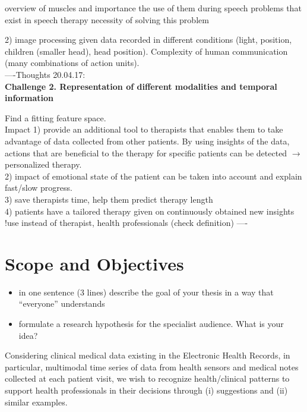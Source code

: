 overview of muscles and importance
the use of them during speech
problems that exist in speech therapy
necessity of solving this problem

2) image processing given data recorded in different conditions (light, position, children (smaller head), head position). Complexity of human communication (many combinations of action units).\\


----Thoughts 20.04.17:\\
\textbf{Challenge 2. Representation of different modalities and temporal information}

Find a fitting feature space. \\


Impact 1) provide an additional tool to therapists that enables them to take advantage of data collected from other patients. By using insights of the data, actions that are beneficial to the therapy for specific patients can be detected $\rightarrow$ personalized therapy.\\
2) impact of emotional state of the patient can be taken into account and explain fast/slow progress.\\
3) save therapists time, help them predict therapy length\\
4) patients have a tailored therapy given on continuously obtained new insights\\ 
!use instead of therapist, health professionals (check definition)
----\\


\section{Scope and Objectives}

\begin{itemize}
    \item in one sentence (3 lines) describe the goal of your thesis in a way that ``everyone'' understands
    \item formulate a research hypothesis for the specialist audience. What is your idea?
\end{itemize}


Considering clinical medical data existing in the Electronic Health Records, in particular, multimodal time series of data from health sensors and medical notes collected at each patient visit, we wish to recognize health/clinical patterns to support health professionals in their decisions through (i) suggestions and (ii) similar examples.

